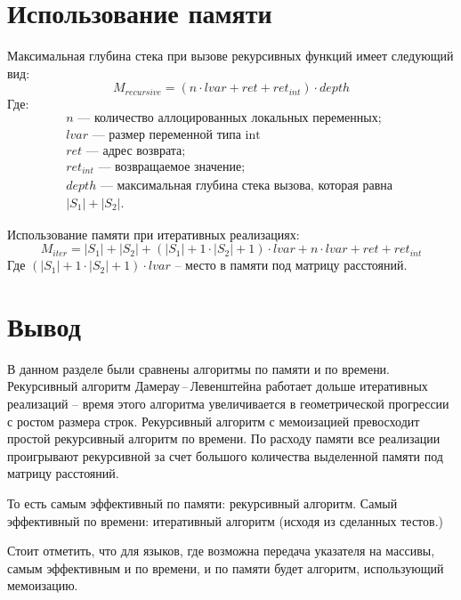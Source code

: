 \section{Использование памяти}

Максимальная глубина стека при вызове рекурсивных функций имеет следующий вид:
\begin{equation}\label{rec-mem}
	M_{recursive} = (n \cdot lvar + ret + ret_{int}) \cdot depth
\end{equation}
Где:
\[
\begin{array}{l}
	n\text{ --- количество аллоцированных локальных переменных}; \\
	lvar\text{ --- размер переменной типа int} \\
	ret\text{ --- адрес возврата;}\\
	ret_{int}\text{ --- возвращаемое значение;}\\
	depth\text{ ---  максимальная глубина стека вызова, которая равна } \\
	|S_1| + |S_2|.
\end{array}
\]

Использование памяти при итеративных реализациях: 
\begin{equation}
	M_{iter} = |S_1| + |S_2| + (|S_1| + 1 \cdot |S_2| + 1) \cdot lvar + n \cdot lvar + ret + ret_{int}
\end{equation}
Где $(|S_1| + 1 \cdot |S_2| + 1) \cdot lvar$ -- место в памяти под матрицу расстояний.

\section{Вывод}
В данном разделе были сравнены алгоритмы по памяти и по времени.
Рекурсивный алгоритм  Дамерау\,--\,Левенштейна работает дольше итеративных реализаций -- время этого алгоритма увеличивается в геометрической прогрессии с ростом размера строк.
Рекурсивный алгоритм с мемоизацией превосходит простой рекурсивный алгоритм по времени. 
По расходу памяти все реализации проигрывают рекурсивной за счет большого количества выделенной памяти под матрицу расстояний. 

То есть самым эффективный по памяти: рекурсивный алгоритм.
Самый эффективный по времени: итеративный алгоритм (исходя из сделанных тестов.)  

Стоит отметить, что для языков, где возможна передача указателя на массивы, самым эффективным и по времени, и по памяти будет алгоритм, использующий мемоизацию.